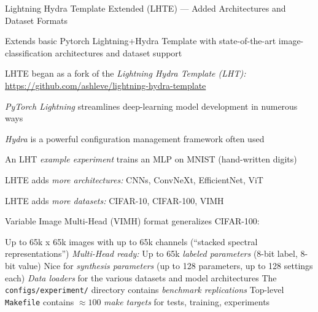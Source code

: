 



\begin{slide}[\slideopts,toc={LHTE}]{Lightning Hydra Template Extended (LHTE) --- Added Architectures and Dataset Formats}


  

  \begin{itemize}

    \mpitem Extends basic Pytorch Lightning+Hydra Template with state-of-the-art image-classification architectures and dataset support

    \mpitem LHTE began as a fork of the \emph{Lightning Hydra Template (LHT):} \url{https://github.com/ashleve/lightning-hydra-template}
    \begin{itemize}

      \mpitem \emph{PyTorch Lightning} streamlines deep-learning model development in
      numerous ways

      \mpitem \emph{Hydra} is a powerful configuration management framework often used

      \mpitem An LHT \emph{example experiment} trains an MLP on MNIST (hand-written digits)

    \end{itemize}

    \mpitem LHTE adds \emph{more architectures:} CNNs, ConvNeXt, EfficientNet, ViT

    \mpitem LHTE adds \emph{more datasets:} CIFAR-10, CIFAR-100, VIMH

    \mpitem Variable Image Multi-Head (VIMH) format generalizes CIFAR-100:
    \begin{itemize}
      \mpitem Up to 65k x 65k images with up to 65k channels (``stacked spectral representations'')
      \mpitem \emph{Multi-Head ready:} Up to 65k \emph{labeled parameters} (8-bit label, 8-bit value)
      \mpitem Nice for \emph{synthesis parameters} (up to 128 parameters, up to 128 settings each)
      \mpitem \emph{Data loaders} for the various datasets and model architectures
      \mpitem The \texttt{configs/experiment/} directory contains \emph{benchmark replications} %
      \mpitem Top-level \texttt{Makefile} contains $\approx100$ \emph{make targets} for tests, training, experiments
    \end{itemize}
  \end{itemize}


\end{slide}

